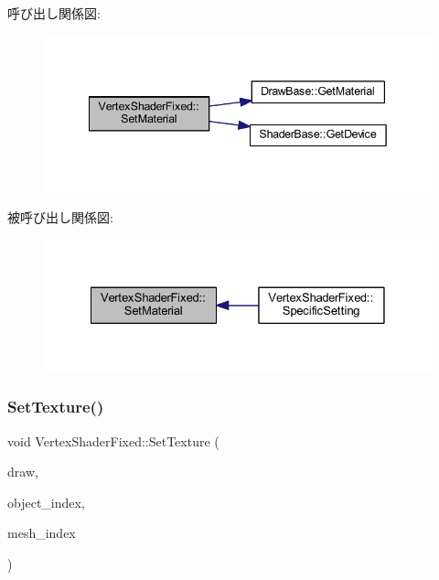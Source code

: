 呼び出し関係図\+:\nopagebreak
\begin{figure}[H]
\begin{center}
\leavevmode
\includegraphics[width=342pt]{class_vertex_shader_fixed_a05ce5fdd8ff190b9934497f42cf19a38_cgraph}
\end{center}
\end{figure}
被呼び出し関係図\+:\nopagebreak
\begin{figure}[H]
\begin{center}
\leavevmode
\includegraphics[width=328pt]{class_vertex_shader_fixed_a05ce5fdd8ff190b9934497f42cf19a38_icgraph}
\end{center}
\end{figure}
\mbox{\label{class_vertex_shader_fixed_a1caad0cf4c86788ed17c2a8da8645414}} 
\subsubsection{\texorpdfstring{Set\+Texture()}{SetTexture()}}
{\footnotesize\ttfamily void Vertex\+Shader\+Fixed\+::\+Set\+Texture (\begin{DoxyParamCaption}\item[{\mbox{\hyperlink{class_draw_base}{Draw\+Base}} $\ast$}]{draw,  }\item[{unsigned}]{object\+\_\+index,  }\item[{unsigned}]{mesh\+\_\+index }\end{DoxyParamCaption})\hspace{0.3cm}{\ttfamily [private]}}



